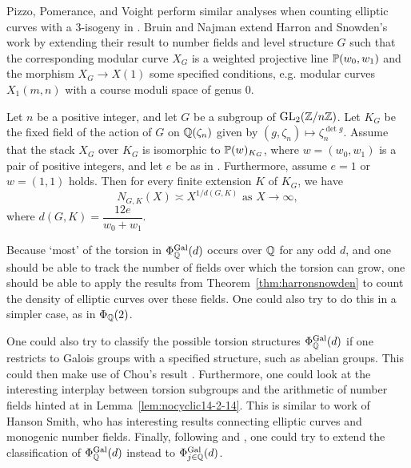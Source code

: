 Pizzo, Pomerance, and Voight perform similar analyses when counting elliptic curves with a 3-isogeny in \cite{pizzopomerancevoight20}. Bruin and Najman extend Harron and Snowden's work by extending their result to number fields and level structure $G$ such that the corresponding modular curve $X_G$ is a weighted projective line $\mathbb{P}(w_0, w_1)$ and the morphism $X_G \to X(1)$ some specified conditions, e.g. modular curves $X_1(m,n)$ with a course moduli space of genus 0. 


\begin{thm}
Let $n$ be a positive integer, and let $G$ be a subgroup of $\operatorname{GL}_2(\mathbb{Z}/n\mathbb{Z})$. Let $K_G$ be the fixed field of the action of $G$ on $\mathbb{Q}(\zeta_n)$ given by $(g,\zeta_n) \mapsto \zeta_n^{\det g}$. Assume that the stack $X_G$ over $K_G$ is isomorphic to $\mathbb{P}(w)_{K_G}$, where $w= (w_0, w_1)$ is a pair of positive integers, and let $e$ be as in \cite[Lem~4.1]{bruinnajman20}. Furthermore, assume $e= 1$ or $w= (1,1)$ holds. Then for every finite extension $K$ of $K_G$, we have
	\[
	N_{G,K}(X) \asymp X^{1/d(G,K)} \text{ as } X \to \infty,
	\]
where $d(G,K)= \dfrac{12e}{w_0 + w_1}$. 
\end{thm}


Because `most' of the torsion in $\Phi_{\mathbb{Q}}^{\operatorname{Gal}}(d)$ occurs over $\mathbb{Q}$ for any odd $d$, and one should be able to track the number of fields over which the torsion can grow, one should be able to apply the results from Theorem~\ref{thm:harronsnowden} to count the density of elliptic curves over these fields. One could also try to do this in a simpler case, as in $\Phi_{\mathbb{Q}}(2)$. 


One could also try to classify the possible torsion structures $\Phi_{\mathbb{Q}}^{\operatorname{Gal}}(d)$ if one restricts to Galois groups with a specified structure, such as abelian groups. This could then make use of Chou's result \cite{chou19}. Furthermore, one could look at the interesting interplay between torsion subgroups and the arithmetic of number fields hinted at in Lemma~\ref{lem:nocyclic14-2-14}. This is similar to work of Hanson Smith, who has interesting results connecting elliptic curves and monogenic number fields. Finally, following \cite{guzvic19} and \cite{cremonanajman21}, one could try to extend the classification of $\Phi_{\mathbb{Q}}^{\operatorname{Gal}}(d)$ instead to $\Phi_{j \in \mathbb{Q}}^{\operatorname{Gal}}(d)$. 
